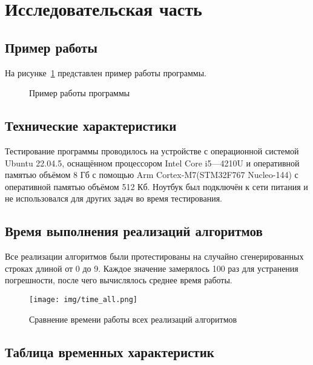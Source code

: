 \section{Исследовательская часть}

\subsection{Пример работы}

\noindent
\hspace{0.75cm}
На рисунке~\ref{img:work_example} представлен пример работы программы.

\begin{figure}[H]
    \caption{Пример работы программы}
    \label{img:work_example}
\end{figure}

\subsection{Технические характеристики}

\noindent
\hspace{0.75cm}
Тестирование программы проводилось на устройстве с операционной системой Ubuntu 22.04.5, оснащённом процессором Intel Core i5---4210U и оперативной памятью объёмом 8 Гб с помощью Arm Cortex-M7(STM32F767 Nucleo-144) с оперативной памятью объёмом 512 Кб. Ноутбук был подключён к сети питания и не использовался для других задач во время тестирования.

\subsection{Время выполнения реализаций алгоритмов}

\noindent
\hspace{0.75cm}
Все реализации алгоритмов были протестированы на случайно сгенерированных строках длиной от 0 до 9. Каждое значение замерялось 100 раз для устранения погрешности, после чего вычислялось среднее время работы.

\begin{figure}[H]
    \centering
    \texttt{[image: img/time\_all.png]}
    \caption{Сравнение времени работы всех реализаций алгоритмов}
    \label{img:time_all}
\end{figure}

\subsection{Таблица временных характеристик}

